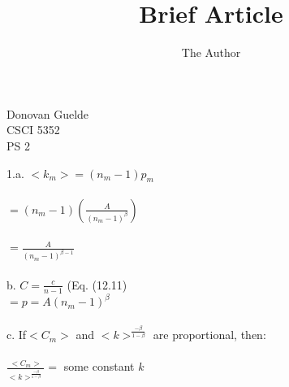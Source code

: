 \documentclass[11pt, oneside]{article}   	%
\title{Brief Article}
\author{The Author}
\begin{document}

\begin{flushright}
Donovan Guelde\\
CSCI 5352\\
PS 2\\
\end{flushright}
1.a.  $<k_m> = (n_m - 1)p_m$\\\\
\indent $ = (n_m -1)(\frac{A}{(n_m - 1)^\beta})$\\\\
\indent$ = \frac{A}{(n_m - 1)^{\beta - 1}}$\\\\
b.  $ C = \frac{c}{n-1}$ (Eq. (12.11)\\
 \indent $= p = A(n_m - 1)^\beta$\\\\
c. If$ <C_m>$ and $<k>^\frac{-\beta}{1-\beta}$ are proportional, then:\\\\
\indent  $\frac {<C_m>} {<k>^\frac{-\beta}{1-\beta}} = $ some constant $k$ \\
\end{document}

